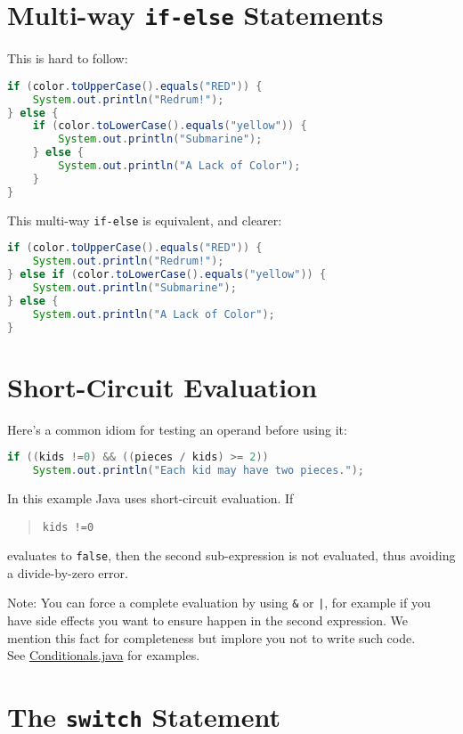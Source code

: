 \documentclass{article}
\begin{document}
\section{Multi-way {\tt if-else} Statements}


This is hard to follow:
\begin{lstlisting}[language=Java]
if (color.toUpperCase().equals("RED")) {
    System.out.println("Redrum!");
} else {
    if (color.toLowerCase().equals("yellow")) {
        System.out.println("Submarine");
    } else {
        System.out.println("A Lack of Color");
    }
}
\end{lstlisting}

This multi-way {\tt if-else} is equivalent, and clearer:

\begin{lstlisting}[language=Java]
if (color.toUpperCase().equals("RED")) {
    System.out.println("Redrum!");
} else if (color.toLowerCase().equals("yellow")) {
    System.out.println("Submarine");
} else {
    System.out.println("A Lack of Color");
}
\end{lstlisting}


\section{Short-Circuit Evaluation}

Here's a common idiom for testing an operand before using it:
\begin{lstlisting}[language=Java]
if ((kids !=0) && ((pieces / kids) >= 2))
    System.out.println("Each kid may have two pieces.");
\end{lstlisting}

In this example Java uses short-circuit evaluation.  If
\begin{quote}
{\tt kids !=0}\\
\end{quote}
evaluates to {\tt false}, then the second sub-expression is not evaluated, thus avoiding a divide-by-zero error.


Note: You can force a complete evaluation by using {\tt \&} or {\tt |}, for example if you have side effects you want to ensure happen in the second expression.  We mention this fact for completeness but implore you not to write such code.\\

See \href{\code/basics/Conditionals.java}{Conditionals.java} for examples.



\section{The {\tt switch} Statement}
\end{document}
